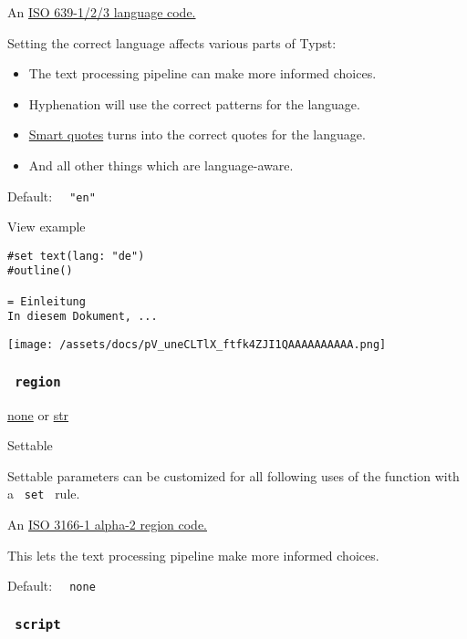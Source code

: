 An \href{https://en.wikipedia.org/wiki/ISO_639}{ISO 639-1/2/3 language
code.}

Setting the correct language affects various parts of Typst:

\begin{itemize}
\tightlist
\item
  The text processing pipeline can make more informed choices.
\item
  Hyphenation will use the correct patterns for the language.
\item
  \href{/docs/reference/text/smartquote/}{Smart quotes} turns into the
  correct quotes for the language.
\item
  And all other things which are language-aware.
\end{itemize}

Default: \texttt{\ }{\texttt{\ "en"\ }}\texttt{\ }


View example

\begin{verbatim}
#set text(lang: "de")
#outline()

= Einleitung
In diesem Dokument, ...
\end{verbatim}

\texttt{[image: /assets/docs/pV\_uneCLTlX\_ftfk4ZJI1QAAAAAAAAAA.png]}

\subsubsection{\texorpdfstring{\texttt{\ region\ }}{ region }}\label{parameters-region}

\href{/docs/reference/foundations/none/}{none} {or}
\href{/docs/reference/foundations/str/}{str}

{{ Settable }}

\label{parameters-region-settable-tooltip}
Settable parameters can be customized for all following uses of the
function with a \texttt{\ set\ } rule.

An \href{https://en.wikipedia.org/wiki/ISO_3166-1_alpha-2}{ISO 3166-1
alpha-2 region code.}

This lets the text processing pipeline make more informed choices.

Default: \texttt{\ }{\texttt{\ none\ }}\texttt{\ }

\subsubsection{\texorpdfstring{\texttt{\ script\ }}{ script }}\label{parameters-script}

